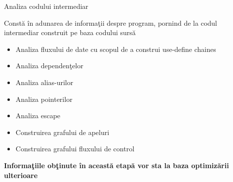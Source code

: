 \documentclass[pdf]{beamer}
\begin{document}
\begin{frame}{Analiza codului intermediar}

Constă în adunarea de informaţii despre program, pornind de la codul intermediar construit pe baza codului sursă

\begin{itemize}
\item
Analiza fluxului de date cu scopul de a construi use-define chaines
\end{itemize}

\begin{itemize}
\item
Analiza dependenţelor
\end{itemize}

\begin{itemize}
\item
Analiza alias-urilor
\end{itemize}

\begin{itemize}
\item
Analiza pointerilor
\end{itemize}

\begin{itemize}
\item
Analiza escape
\end{itemize}

\begin{itemize}
\item
Construirea grafului de apeluri
\end{itemize}

\begin{itemize}
\item
Construirea grafului fluxului de control
\end{itemize}

\textbf{Informaţiile obţinute în această etapă vor sta la baza optimizării ulterioare}
\end{frame}
\end{document}
